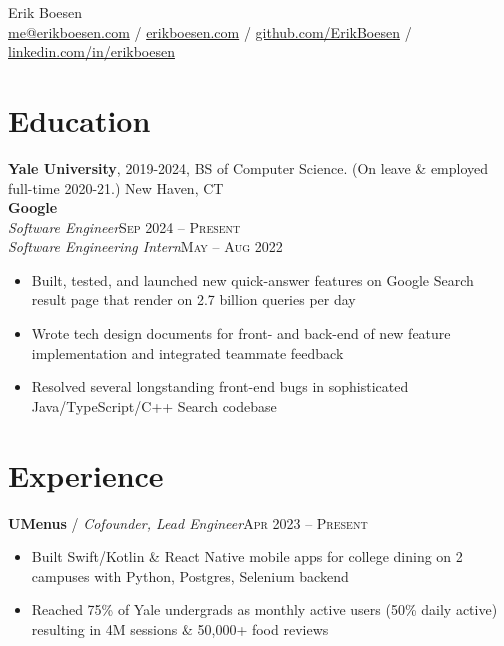 \documentclass[10pt, a4paper]{article}
\begin{document}
{\LARGE Erik Boesen}\\
\href{mailto:me@erikboesen.com}{me@erikboesen.com} / \href{https://erikboesen.com}{erikboesen.com} / \href{https://github.com/ErikBoesen}{github.com/ErikBoesen} / \href{https://www.linkedin.com/in/erikboesen}{linkedin.com/in/erikboesen}\\

\vspace{-7mm}
\section*{Education}
\noindent
\textbf{Yale University}, 2019-2024, BS of Computer Science. (On leave \& employed full-time 2020-21.) New Haven, CT\\

\textbf{Google}\\
\textit{Software Engineer}\hfill \textsc{Sep 2024 -- Present}\\
\textit{Software Engineering Intern}\hfill \textsc{May -- Aug 2022}\\
\begin{itemize}
    \vspace{-7mm}
    \item Built, tested, and launched new quick-answer features on Google Search result page that render on 2.7 billion queries per day
    \item Wrote tech design documents for front- and back-end of new feature implementation and integrated teammate feedback
    \item Resolved several longstanding front-end bugs in sophisticated Java/TypeScript/C++ Search codebase
\end{itemize}

\vspace{-7mm}
\section*{Experience}
\textbf{UMenus} / \textit{Cofounder, Lead Engineer}\hfill \textsc{Apr 2023 -- Present}\\
\begin{itemize}
    \vspace{-7mm}
    \item Built Swift/Kotlin \& React Native mobile apps for college dining on 2 campuses with Python, Postgres, Selenium backend
    \item Reached 75\% of Yale undergrads as monthly active users (50\% daily active) resulting in 4M sessions \& 50,000+ food reviews

\end{itemize}
\end{document}
